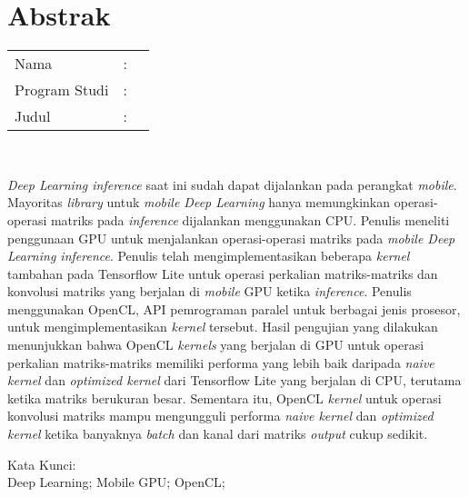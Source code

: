 %
%
%

\chapter*{Abstrak}

\vspace*{0.2cm}

\noindent \begin{tabular}{l l p{10cm}}
	Nama&: & \penulis \\
	Program Studi&: & \program \\
	Judul&: & \judul \\
\end{tabular} \\ 

\vspace*{0.5cm}

\noindent 
\textit{Deep Learning inference} saat ini sudah dapat dijalankan pada perangkat \textit{mobile}. Mayoritas \textit{library} untuk \textit{mobile Deep Learning} hanya memungkinkan operasi-operasi matriks pada \textit{inference} dijalankan menggunakan CPU. Penulis meneliti penggunaan GPU untuk menjalankan operasi-operasi matriks pada \textit{mobile Deep Learning inference}. Penulis telah mengimplementasikan beberapa \textit{kernel} tambahan pada Tensorflow Lite untuk operasi perkalian matriks-matriks dan konvolusi matriks yang berjalan di \textit{mobile} GPU ketika \textit{inference}. Penulis menggunakan OpenCL, API pemrograman paralel untuk berbagai jenis prosesor, untuk mengimplementasikan \textit{kernel} tersebut. Hasil pengujian yang dilakukan menunjukkan bahwa OpenCL \textit{kernels} yang berjalan di GPU untuk operasi perkalian matriks-matriks memiliki performa yang lebih baik daripada \textit{naive kernel} dan \textit{optimized kernel} dari Tensorflow Lite yang berjalan di CPU, terutama ketika matriks berukuran besar. Sementara itu, OpenCL \textit{kernel} untuk operasi konvolusi matriks mampu mengungguli performa \textit{naive kernel} dan \textit{optimized kernel} ketika banyaknya \textit{batch} dan kanal dari matriks \textit{output} cukup sedikit.
\\

\vspace*{0.2cm}

\noindent Kata Kunci: \\ 
\noindent Deep Learning; Mobile GPU; OpenCL; \\

\newpage
